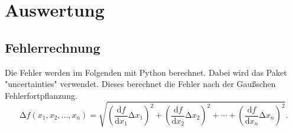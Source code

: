 \documentclass[
  bibliography=totoc,     %
  captions=tableheading,  %
  titlepage=firstiscover, %
]{scrartcl}
\begin{document}
\section{Auswertung}
\label{sec:auswertung}
\subsection{Fehlerrechnung}
Die Fehler werden im Folgenden mit Python berechnet. Dabei wird das Paket "uncertainties"
verwendet. Dieses berechnet die Fehler nach der Gaußschen Fehlerfortpflanzung.
\begin{equation}
    \mathup{\Delta}f(x_1,x_2,...,x_n)=\sqrt{\left(\frac{\mathup{d}f}{\mathup{d}x_1}\mathup{\Delta}x_1\right)^2+\left(\frac{\mathup{d}f}{\mathup{d}x_2}\mathup{\Delta}x_2\right)^2+ \dotsb +\left(\frac{\mathup{d}f}{\mathup{d}x_n}\mathup{\Delta}x_n\right)^2}.
    \label{eqn:formelgauß}
\end{equation}
\end{document}
